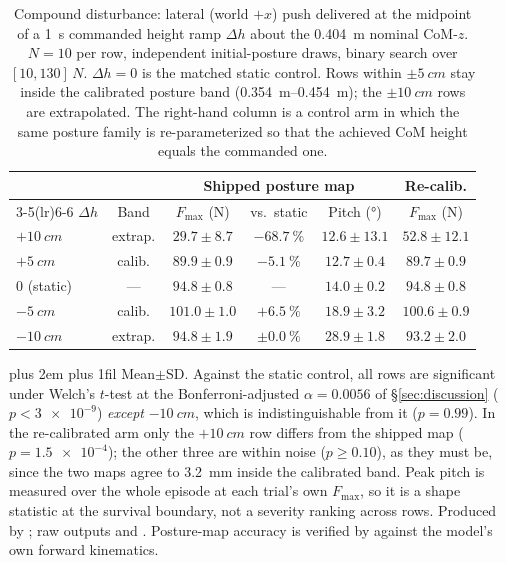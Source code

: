 \documentclass[conference]{IEEEtran}
\newcommand{\tabnote}{\par\leftskip=0pt\rightskip=0pt plus 2em%
  \parfillskip=0pt plus 1fil\relax}
\begin{document}
\begin{table}[t]
\centering
\caption{Compound disturbance: lateral (world $+x$) push delivered at the midpoint of a
\SI{1}{s} commanded height ramp $\Delta h$ about the \SI{0.404}{m} nominal
CoM-$z$. $N{=}10$ per row, independent initial-posture draws, binary search over
$[10,130]\,\si{N}$. $\Delta h{=}0$ is the matched static control. Rows within
$\pm\SI{5}{cm}$ stay inside the calibrated posture band
(\SIrange{0.354}{0.454}{m}); the $\pm\SI{10}{cm}$ rows are extrapolated. The
right-hand column is a control arm in which the same posture family is
re-parameterized so that the achieved CoM height equals the commanded one.}
\label{tab:compound}
\footnotesize
\setlength{\tabcolsep}{4pt}\begin{tabular}{@{}lccccc@{}}
\toprule
& & \multicolumn{3}{c}{Shipped posture map} & Re-calib. \\
\cmidrule(lr){3-5}\cmidrule(lr){6-6}
$\Delta h$ & Band & $F_{\max}$ (N) & vs.\ static & Pitch (\si{\degree}) & $F_{\max}$ (N) \\
\midrule
$+\SI{10}{cm}$ & extrap. & $29.7\pm8.7$  & $-\SI{68.7}{\percent}$ & $12.6\pm13.1$ & $52.8\pm12.1$ \\
$+\SI{5}{cm}$  & calib.  & $89.9\pm0.9$  & $-\SI{5.1}{\percent}$ & $12.7\pm0.4$ & $89.7\pm0.9$ \\
$0$ (static)   & ---     & $\mathbf{94.8\pm0.8}$ & --- & $14.0\pm0.2$ & $\mathbf{94.8\pm0.8}$ \\
$-\SI{5}{cm}$  & calib.  & $101.0\pm1.0$  & $+\SI{6.5}{\percent}$ & $18.9\pm3.2$ & $100.6\pm0.9$ \\
$-\SI{10}{cm}$ & extrap. & $94.8\pm1.9$  & $\pm\SI{0.0}{\percent}$ & $28.9\pm1.8$ & $93.2\pm2.0$ \\
\bottomrule
\end{tabular}
\vspace{2pt}\tabnote\noindent
Mean$\pm$SD. Against the static control, all rows are significant under Welch's
$t$-test at the Bonferroni-adjusted $\alpha{=}0.0056$ of \S\ref{sec:discussion}
($p{<}\num{3e-9}$) \emph{except} $-\SI{10}{cm}$, which is indistinguishable from
it ($p{=}0.99$). In the re-calibrated arm only the $+\SI{10}{cm}$ row differs
from the shipped map ($p{=}\num{1.5e-4}$); the other three are within noise
($p{\geq}0.10$), as they must be, since the two maps agree to
\SI{3.2}{mm} inside the calibrated band. Peak pitch is measured over the
whole episode at each trial's own $F_{\max}$, so it is a shape statistic at the
survival boundary, not a severity ranking across rows. Produced by
; raw outputs
 and
. Posture-map accuracy is verified by
 against the model's own forward kinematics.
\end{table}
\end{document}
